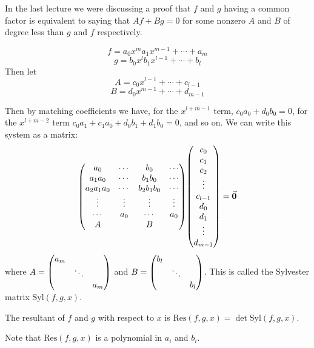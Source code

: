 \documentclass[a4paper,twoside,master.tex]{subfiles}
\begin{document}

In the last lecture we were discussing a proof that $ f $ and $ g $ having a common factor is equivalent to saying that $ Af + Bg = 0 $ for some nonzero $ A $ and $ B $ of degree less than $ g $ and $ f $ respectively.

\begin{equation}
    f = a_0 x^m a_1 x^{m-1} + \cdots + a_m
\end{equation}
\begin{equation}
    g = b_0 x^l b_1 x^{l-1} + \cdots + b_l
\end{equation}
Then let
\begin{equation}
    A = c_0 x^{l-1} + \cdots + c_{l-1}
\end{equation}
\begin{equation}
    B = d_0 x^{m-1} + \cdots + d_{m-1}
\end{equation}

Then by matching coefficients we have, for the $ x^{l+m-1} $ term, $ c_0 a_0 + d_0 b_0 = 0 $, for the $ x^{l+m-2} $ term $ c_0 a_1 + c_1 a_0 + d_0 b_1 + d_1 b_0 = 0 $, and so on. We can write this system as a matrix:
\begin{equation}
    \mqty(a_0 & \cdots & b_0 & \cdots \\ a_1 a_0 & \cdots & b_1 b_0 & \cdots \\ a_2 a_1 a_0 & \cdots & b_2 b_1 b_0 & \cdots \\ \vdots & \vdots & \vdots & \vdots \\ \cdots & a_0 & \cdots & a_0 \\ A & & B) \mqty(c_0 \\ c_1 \\ c_2 \\ \vdots \\ c_{l-1} \\ d_0 \\ d_1 \\ \vdots \\ d_{m-1}) = \va{0}
\end{equation}
where $ A = \mqty(\dmat{a_m , \ddots , a_m}) $ and $ B = \mqty(\dmat{b_l , \ddots , b_l}) $. This is called the Sylvester matrix $ \text{Syl}(f,g,x) $.

The resultant of $ f $ and $ g $ with respect to $ x $ is $ \text{Res}(f,g,x) = \det \text{Syl}(f,g,x) $.

Note that $ \text{Res}(f,g,x) $ is a polynomial in $ a_i $ and $ b_i $.
\end{document}
